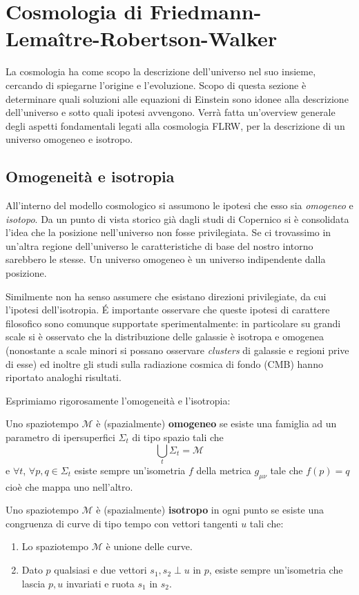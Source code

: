 \chapter{Cosmologia di Friedmann-Lema\^itre-Robertson-Walker}\label{para.cosmo}
La cosmologia ha come scopo la descrizione dell'universo nel suo insieme, cercando di spiegarne l'origine e l'evoluzione. Scopo di questa sezione è determinare quali soluzioni alle equazioni di Einstein sono idonee alla descrizione dell'universo e sotto quali ipotesi avvengono. Verrà fatta un'overview generale degli aspetti fondamentali legati alla cosmologia FLRW, per la descrizione di un universo omogeneo e isotropo.

\section{Omogeneità e isotropia}
All'interno del modello cosmologico si assumono le ipotesi che esso sia \emph{omogeneo} e \emph{isotopo}. Da un punto di vista storico già dagli studi di Copernico si è consolidata l'idea che la posizione nell'universo non fosse privilegiata. Se ci trovassimo in un'altra regione dell'universo le caratteristiche di base del nostro intorno sarebbero le stesse. Un universo omogeneo è un universo indipendente dalla posizione.

Similmente non ha senso assumere che esistano direzioni privilegiate, da cui l'ipotesi dell'isotropia. \'E importante osservare che queste ipotesi di carattere filosofico sono comunque supportate sperimentalmente: in particolare su grandi scale si è osservato che la distribuzione delle galassie è isotropa e omogenea (nonostante a scale minori si possano osservare \emph{clusters} di galassie e regioni prive di esse) ed inoltre gli studi sulla radiazione cosmica di fondo (CMB) hanno riportato analoghi risultati.

Esprimiamo rigorosamente l'omogeneità e l'isotropia:
\begin{definizione}
Uno spaziotempo $\mathcal{M}$ è (spazialmente) \textbf{omogeneo} se esiste una famiglia ad un parametro di ipersuperfici $\Sigma_t$ di tipo spazio tali che
\begin{equation*}
    \bigcup_t \Sigma_t = \mathcal{M}
\end{equation*}
e $\forall t$, $\forall p,q \in \Sigma_t$ esiste sempre un'isometria $f$ della metrica $g_{\mu\nu}$ tale che $f(p)=q$ cioè che mappa uno nell'altro.
\end{definizione}

\begin{definizione}
Uno spaziotempo $\mathcal{M}$ è (spazialmente) \textbf{isotropo} in ogni punto se esiste una congruenza di curve di tipo tempo con vettori tangenti $u$ tali che:
\begin{enumerate}
    \item Lo spaziotempo $\mathcal{M}$ è unione delle curve.
    \item Dato $p$ qualsiasi e due vettori $s_1, s_2 \perp u$ in $p$, esiste sempre un'isometria che lascia $p,u$ invariati e ruota $s_1$ in $s_2$.
\end{enumerate}
\end{definizione}


